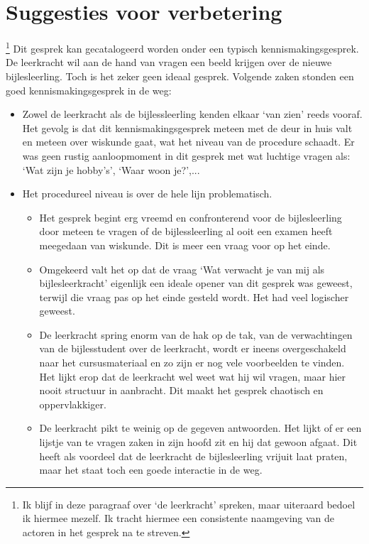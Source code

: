 \documentclass[a4paper,12pt]{article}
\theoremstyle{definition}
\begin{document}
\section{Suggesties voor verbetering}\footnote{Ik blijf in deze paragraaf over `de leerkracht' spreken, maar uiteraard bedoel ik hiermee mezelf. Ik tracht 
hiermee een consistente naamgeving van de actoren in het gesprek na te streven.}
Dit gesprek kan gecatalogeerd worden onder een typisch kennismakingsgesprek. De 
leerkracht wil aan de hand van vragen een beeld krijgen over de nieuwe 
bijlesleerling.  Toch is het zeker geen ideaal gesprek. Volgende zaken stonden 
een goed kennismakingsgesprek in de weg:
\begin{itemize}
  \item Zowel de leerkracht als de bijlessleerling kenden elkaar `van zien' 
  reeds vooraf. Het gevolg is dat dit kennismakingsgesprek meteen met de deur in 
  huis valt en meteen over wiskunde gaat, wat het niveau van de procedure schaadt. Er was geen rustig aanloopmoment in
  dit gesprek met wat luchtige vragen als: `Wat zijn je hobby's', `Waar woon je?',... 
  \item Het procedureel niveau is over de hele lijn problematisch. 
  \begin{itemize}
    \item Het gesprek begint erg vreemd en confronterend voor de bijlesleerling door meteen te vragen of de bijlessleerling 
    al ooit een examen heeft meegedaan van wiskunde. Dit is meer een vraag voor 
    op het einde.
    \item Omgekeerd valt het op dat de vraag `Wat verwacht je van mij als 
    bijlesleerkracht' eigenlijk een ideale opener van dit gesprek was geweest, 
    terwijl die vraag pas op het einde gesteld wordt. Het had veel logischer 
    geweest.
    \item De leerkracht spring enorm van de hak op de tak, van de verwachtingen 
   van de bijlesstudent over de leerkracht, wordt er ineens overgeschakeld naar 
   het cursusmateriaal en zo zijn er nog vele voorbeelden te vinden. Het lijkt 
   erop dat de leerkracht wel weet wat hij wil vragen, maar hier nooit structuur 
   in aanbracht. Dit maakt het gesprek chaotisch en oppervlakkiger.
     \item De leerkracht 
  pikt te weinig op de gegeven antwoorden. Het lijkt of er een lijstje van te 
  vragen zaken in zijn hoofd zit en hij dat gewoon afgaat. Dit heeft als 
  voordeel dat de leerkracht de bijlesleerling vrijuit laat praten, maar het 
  staat toch een goede interactie in de weg.


\end{itemize}
\end{itemize}
\end{document}
